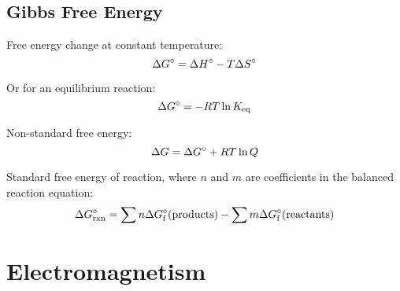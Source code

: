 \documentclass[10pt]{article}
\begin{document}

\subsection{Gibbs Free Energy}

Free energy change at constant temperature:
\begin{equation*}
\Delta G\not = \Delta H\not - T \Delta S\not
\end{equation*}

Or for an equilibrium reaction:
\begin{equation*}
\Delta G\not = -RT\ln K_{\textnormal{eq}}
\end{equation*}

Non-standard free energy:
\begin{equation*}
\Delta G = \Delta G\not + RT\ln Q
\end{equation*}

Standard free energy of reaction, where $n$ and $m$ are coefficients in the balanced reaction equation:
\begin{equation*}
\Delta G\not_\textnormal{rxn} = \sum{n\Delta G\not_\textnormal{f}(\textnormal{products})}-\sum{m\Delta G\not_\textnormal{f}(\textnormal{reactants})}
\end{equation*}





\newpage
\section{Electromagnetism}

\end{document}

